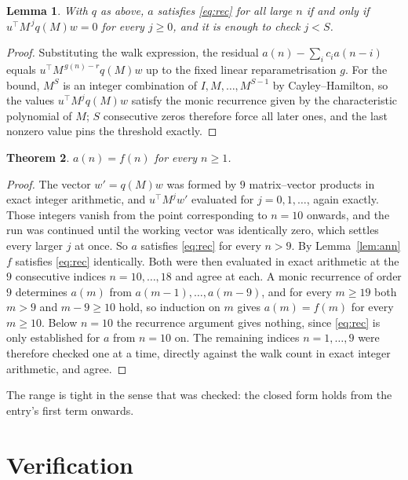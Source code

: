 \documentclass[11pt,a4paper]{article}
\theoremstyle{plain}
\newtheorem{theorem}{Theorem}
\newtheorem{lemma}[theorem]{Lemma}
\theoremstyle{definition}
\begin{document}
\begin{lemma}\label{lem:crit}
With $q$ as above, $a$ satisfies \eqref{eq:rec} for all large $n$ if and only if
$u^{\!\top}M^{\,j}q(M)w=0$ for every $j\ge0$, and it is enough to check $j<S$.
\end{lemma}

\begin{proof}
Substituting the walk expression, the residual $a(n)-\sum_ic_ia(n-i)$ equals
$u^{\!\top}M^{\,g(n)-r}q(M)w$ up to the fixed linear reparametrisation $g$. For the bound,
$M^{S}$ is an integer combination of $I,M,\dots,M^{S-1}$ by Cayley--Hamilton, so the values
$u^{\!\top}M^{j}q(M)w$ satisfy the monic recurrence given by the characteristic polynomial of
$M$; $S$ consecutive zeros therefore force all later ones, and the last nonzero value pins the
threshold exactly.
\end{proof}

\begin{theorem}
$a(n)=f(n)$ for every $n\ge1$.
\end{theorem}

\begin{proof}
The vector $w'=q(M)w$ was formed by $9$ matrix--vector products in exact integer
arithmetic, and $u^{\!\top}M^{j}w'$ evaluated for $j=0,1,\dots$, again exactly. Those integers
vanish from the point corresponding to $n=10$ onwards, and the run was continued until the
working vector was identically zero, which settles every larger $j$ at once. So $a$ satisfies
\eqref{eq:rec} for every $n>9$. By Lemma~\ref{lem:ann} $f$ satisfies \eqref{eq:rec}
identically. Both were then evaluated in exact arithmetic at the $9$ consecutive indices
$n=10,\dots,18$ and agree at each. A monic recurrence of order $9$
determines $a(m)$ from $a(m-1),\dots,a(m-9)$, and for every $m\ge19$ both
$m>9$ and $m-9\ge10$ hold, so induction on $m$ gives $a(m)=f(m)$ for every
$m\ge10$.
Below $n=10$ the recurrence argument gives nothing, since \eqref{eq:rec} is only
established for $a$ from $n=10$ on. The remaining indices $n=1,\dots,9$ were
therefore checked one at a time, directly against the walk count in exact integer arithmetic,
and agree.
\end{proof}

The range is tight in the sense that was checked: the closed form holds from the entry's first term onwards.

\section{Verification}
\end{document}
